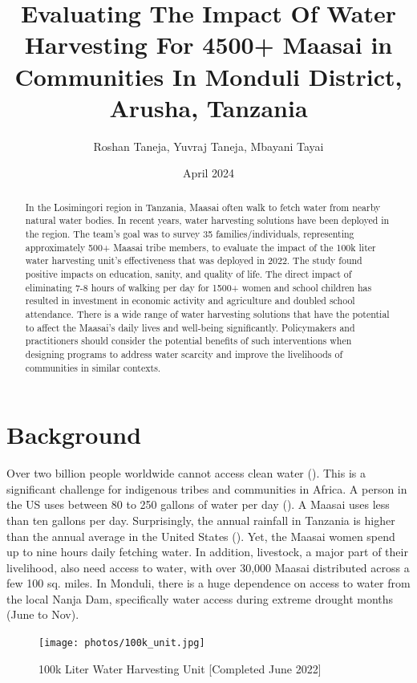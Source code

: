 \documentclass[10pt, twocolumn]{article}
\title{Evaluating The Impact Of Water Harvesting For 4500+ Maasai in Communities In Monduli District, Arusha, Tanzania}
\author{Roshan Taneja, Yuvraj Taneja, Mbayani Tayai}
\date{April 2024}
\begin{document}
\maketitle

\begin{abstract}
In the Losimingori region in Tanzania, Maasai often walk to fetch water from nearby natural water bodies. In recent years, water harvesting solutions have been deployed in the region. The team's goal was to survey 35 families/individuals, representing approximately 500+ Maasai tribe members, to evaluate the impact of the 100k liter water harvesting unit's effectiveness that was deployed in 2022. The study found positive impacts on education, sanity, and quality of life. The direct impact of eliminating 7-8 hours of walking per day for 1500+ women and school children has resulted in investment in economic activity and agriculture and doubled school attendance. There is a wide range of water harvesting solutions that have the potential to affect the Maasai's daily lives and well-being significantly. Policymakers and practitioners should consider the potential benefits of such interventions when designing programs to address water scarcity and improve the livelihoods of communities in similar contexts.
\end{abstract}

\section{Background}

Over two billion people worldwide cannot access clean water (\autocite{UNICEF2023}). This is a significant challenge for indigenous tribes and communities in Africa. A person in the US uses between 80 to 250 gallons of water per day (\autocite{EPA}). A Maasai uses less than ten gallons per day. Surprisingly, the annual rainfall in Tanzania is higher than the annual average in the United States (\autocite{Monduli}). Yet, the Maasai women spend up to nine hours daily fetching water. In addition, livestock, a major part of their livelihood, also need access to water, with over 30,000 Maasai distributed across a few 100 sq. miles. In Monduli, there is a huge dependence on access to water from the local Nanja Dam, specifically water access during extreme drought months (June to Nov).

\begin{figure}
    \centering
    \texttt{[image: photos/100k\_unit.jpg]}
    \caption{100k Liter Water Harvesting Unit [Completed June 2022]}
    \label{fig:100k_unit}
\end{figure}
\end{document}
